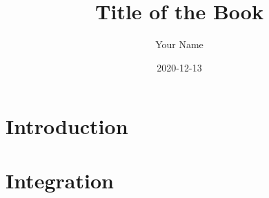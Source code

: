 \documentclass{memoir}
\title{Title of the Book}
\date{2020-12-13}
\author{Your Name}
\begin{document}
\frontmatter
{}
\maketitle
\newpage
\tableofcontents
\newpage
\listoffigures
\newpage
\listoftables
\newpage
\lstlistoflistings


\mainmatter
\part{Introduction}

%
\part{Integration}
%
%

\appendix
%
%

\backmatter
\printglossary[type=\acronymtype]
\printglossary


\printindex
\end{document}
